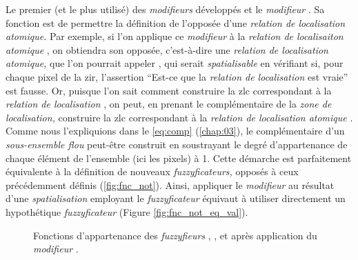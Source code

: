 Le premier (et le plus utilisé) des \emph{modifieurs} développés et le
\emph{modifieur} . Sa fonction est de permettre la
définition de l'opposée d'une \emph{relation de localisation
  atomique.} Par exemple, si l'on applique ce \emph{modifieur} à la
\emph{relation de localisaiton atomique}
, on obtiendra son opposée,
c'est-à-dire une \emph{relation de localisation atomique,} que l'on
pourrait appeler , qui serait
\emph{spatialisable} en vérifiant si, pour chaque pixel de la
\ac{zir}, l'assertion \enquote{Est-ce que la \emph{relation de
    localisation}  est vraie} est
fausse. Or, puisque l'on sait comment construire la \ac{zlc}
correspondant à la \emph{relation de localisation}
, on peut, en prenant le
complémentaire de la \emph{zone de localisation,} construire la
\ac{zlc} correspondant à la \emph{relation de localisation atomique}
. Comme nous l'expliquions dans
le \autoref{eq:comp} (\autoref{chap:03}), le complémentaire d'un
\emph{sous-ensemble flou} peut-être construit en soustrayant le degré
d'appartenance de chaque élément de l'ensemble (ici les pixels) à
1. Cette démarche est parfaitement équivalente à la définition de
nouveaux \emph{fuzzyficateurs,} opposés à ceux précédemment définis
(\autoref{fig:fnc_not}). Ainsi, appliquer le \emph{modifieur}
 au résultat d'une \emph{spatialisation} employant le
\emph{fuzzyficateur}  équivaut à utiliser directement un
hypothétique \emph{fuzzyficateur}  (Figure
\ref{fig:fnc_not_eq_val}).

\begin{figure}
  \centering
  
  \hfill  
  \caption{Fonctions d'appartenance des \emph{fuzzyfieurs}
    \protect{}, \protect{}, et
    \protect{} après application du \emph{modifieur}
    \protect{}.}
  \label{fig:fnc_not}
\end{figure}

